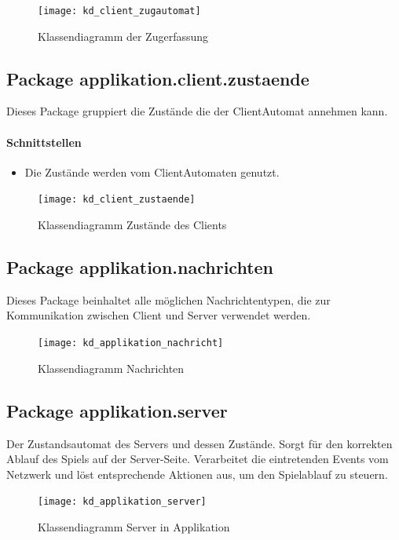 \documentclass[12pt,halfparskip]{scrartcl}
\begin{document}
		\begin{figure}[H]
			\centering
			\texttt{[image: kd\_client\_zugautomat]}
			\caption{Klassendiagramm der Zugerfassung}
			\label{fig:kd_client_zugautomat}
		\end{figure}
		
	\subsection{Package applikation.client.zustaende}

		Dieses Package gruppiert die Zustände die der ClientAutomat annehmen kann.

		\paragraph{Schnittstellen}
		\begin{itemize}
			\item Die Zustände werden vom ClientAutomaten genutzt.
		\end{itemize}
		
		\begin{figure}[H]
			\centering
			\texttt{[image: kd\_client\_zustaende]}
			\caption{Klassendiagramm Zustände des Clients}
			\label{fig:kd_client_zustaende}
		\end{figure}
	
\subsection{Package applikation.nachrichten}

	Dieses Package beinhaltet alle möglichen Nachrichtentypen, die zur Kommunikation zwischen Client und Server verwendet werden.
	\begin{figure}[H]
		\centering
		\texttt{[image: kd\_applikation\_nachricht]}
		\caption{Klassendiagramm Nachrichten}
		\label{fig:kd_applikation_nachricht}
	\end{figure}

\subsection{Package applikation.server}

	Der Zustandsautomat des Servers und dessen Zustände. Sorgt für den korrekten Ablauf des Spiels auf der Server-Seite. Verarbeitet die eintretenden Events vom Netzwerk und löst entsprechende Aktionen aus, um den Spielablauf zu steuern.

	\begin{figure}[H]
		\centering
		\texttt{[image: kd\_applikation\_server]}
		\caption{Klassendiagramm Server in Applikation}
		\label{fig:kd_applikation_server}
	\end{figure}
	
\end{document}

